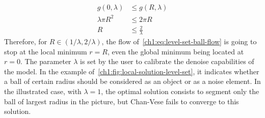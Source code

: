 \begin{align*}
	g(0,\lambda) &\leq g(R,\lambda) \\
	\lambda \pi R^2 &\leq 2\pi R \\
	R &\leq \frac{2}{\lambda}
\end{align*}
%
Therefore, for $R \in (1/\lambda, 2/\lambda)$, the flow of~\cref{ch1:eq:level-set-ball-flow} is going to stop at the local minimum $r=R$, even the global minimum being located at $r=0$. 
%
The parameter $\lambda$ is set by the user to calibrate the denoise capabilities of the model. In the example of~\cref{ch1:fig:local-solution-level-set}, it indicates whether a ball of certain radius should be considered as an object or as a noise element. In the illustrated case, with $\lambda=1$, the optimal solution consists to segment only the ball of largest radius in the picture, but Chan-Vese fails to converge to this solution.

